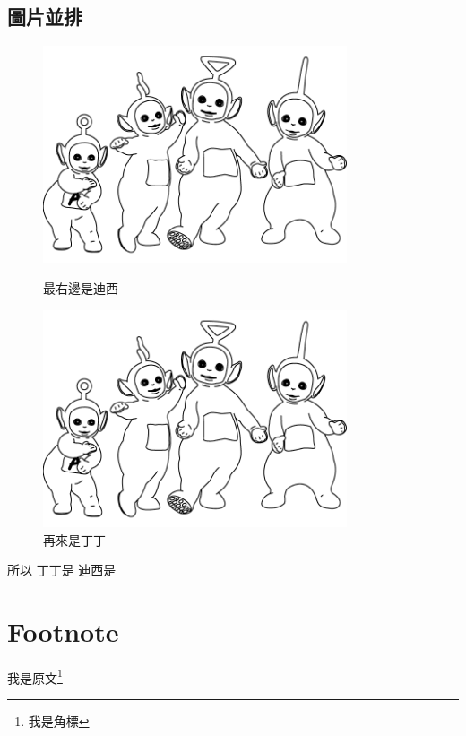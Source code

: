 \subsection{圖片並排}
\begin{figure}[H]%
  \centering %
  \begin{minipage}[b]{0.4\textwidth} %
    \centering %
    \includegraphics[width=0.8\textwidth]{a.png}
    \caption{最右邊是迪西}
    \label{fig:迪西}
  \end{minipage}
  \begin{minipage}[b]{0.4\textwidth} %
    \centering %
    \includegraphics[width=0.8\textwidth]{a.png}
    \caption{再來是丁丁}
    \label{fig:丁丁}
  \end{minipage}
\end{figure}
所以
丁丁是
迪西是
\section{Footnote}
我是原文\footnote{我是角標}
\newpage


